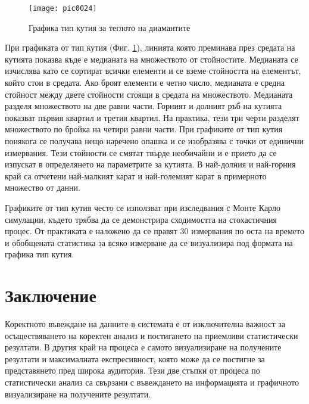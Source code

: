 \begin{figure}[h!]
  \centering
  \texttt{[image: pic0024]}
  \caption{Графика тип кутия за теглото на диамантите}
\label{figure0024}
\end{figure}
\FloatBarrier

При графиката от тип кутия (Фиг. \ref{figure0024}), линията която преминава през средата на кутията показва къде е медианата на множеството от стойностите. Медианата се изчислява като се сортират всички елементи и се вземе стойността на елементът, който стои в средата. Ако броят елементи е четно число, медианата е средна стойност между двете стойности стоящи в средата на множеството. Медианата разделя множеството на две равни части. Горният и долният ръб на кутията показват първия квартил и третия квартил. На практика, тези три черти разделят множеството по бройка на четири равни части. При графиките от тип кутия понякога се получава нещо наречено опашка и се изобразява с точки от единични измервания. Тези стойности се смятат твърде необичайни и е прието да се изпускат в определянето на параметрите за кутията. В най-долния и най-горния край са отчетени най-малкият карат и най-големият карат в примерното множество от данни. 

Графиките от тип кутия често се използват при изследвания с Монте Карло симулации, където трябва да се демонстрира сходимостта на стохастичния процес. От практиката е наложено да се правят 30 измервания по оста на времето и обобщената статистика за всяко измерване да се визуализира под формата на графика тип кутия. 

\section*{Заключение}

Коректното въвеждане на данните в системата е от изключителна важност за осъществяването на коректен анализ и постигането на приемливи статистически резултати. В другия край на процеса е самото визуализиране на получените резултати и максималната експресивност, която може да се постигне за представянето пред широка аудитория. Тези две стъпки от процеса по статистически анализ са свързани с въвеждането на информацията и графичното визуализиране на получените резултати. 


